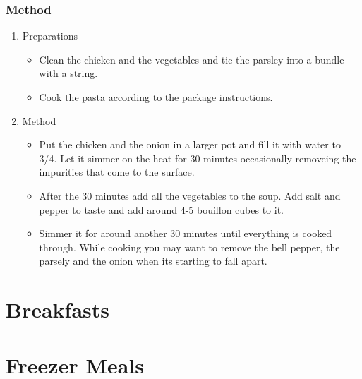 \documentclass[
	11pt, %
	fleqn, %
	a4paper, %
]{LegrandOrangeBook}
\begin{document}
		\section{Method}	
			\begin{enumerate}
				\item Preparations
					\begin{itemize}
						\item Clean the chicken and the vegetables and tie the parsley into a bundle with a string.
						\item Cook the pasta according to the package instructions.
					\end{itemize}
				\item Method
					\begin{itemize}
						\item Put the chicken and the onion in a larger pot and fill it with water to 3/4. Let it simmer on the heat for 30 minutes occasionally removeing the impurities that come to the surface.
						\item After the 30 minutes add all the vegetables to the soup. Add salt and pepper to taste and add around 4-5 bouillon cubes to it. 
						\item Simmer it for around another 30 minutes until everything is cooked through. While cooking you may want to remove the bell pepper, the parsely and the onion when its starting to fall apart.
					\end{itemize}
			\end{enumerate}					
	

\part{Breakfasts}
	\chapterspaceabove{6.75cm}
	\chapterspacebelow{7.25cm}


\part{Freezer Meals}
	\chapterspaceabove{6.75cm}
	\chapterspacebelow{7.25cm}
\end{document}
